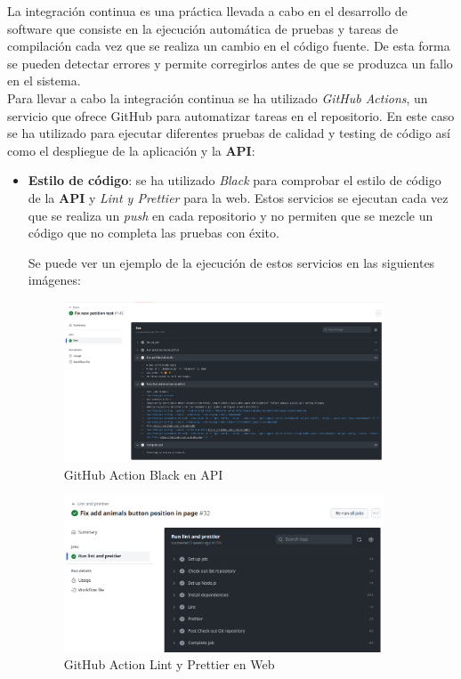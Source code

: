La integración continua es una práctica llevada a cabo en el desarrollo de software que consiste en la ejecución
automática de pruebas y tareas de compilación cada vez que se realiza un cambio en el código fuente. De esta
forma se pueden detectar errores y permite corregirlos antes de que se produzca un fallo en el sistema. \\

Para llevar a cabo la integración continua se ha utilizado \textit{GitHub Actions}, un servicio que ofrece
GitHub para automatizar tareas en el repositorio. En este caso se ha utilizado para ejecutar diferentes pruebas
de calidad y testing de código así como el despliegue de la aplicación y la \textbf{API}:


\begin{itemize}
    \item \textbf{Estilo de código}: se ha utilizado \textit{Black} para comprobar el estilo de código de la
    \textbf{API} y \textit{Lint y Prettier} para la web. Estos servicios se ejecutan cada vez que se realiza un
    \textit{push} en cada repositorio y no permiten que se mezcle un código que no completa las pruebas con éxito.

    \newpage

    Se puede ver un ejemplo de la ejecución de estos servicios en las siguientes imágenes: \\

    \begin{figure}[H]
        \centering
        \includegraphics[width=0.9\textwidth]{imgs/black-action.png}
        \caption{GitHub Action Black en API}
        \label{fig:black-action}
    \end{figure}

    \begin{figure}[H]
        \centering
        \includegraphics[width=0.9\textwidth]{imgs/lint-prettier-action.png}
        \caption{GitHub Action Lint y Prettier en Web}
        \label{fig:lint-prettier-action}
    \end{figure}


\end{itemize}
